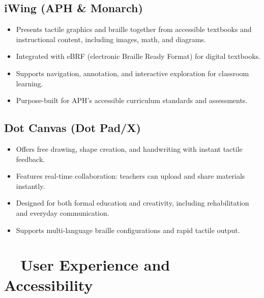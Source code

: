 \subsection{iWing (APH \& Monarch)}
\begin{itemize}
	\item Presents tactile graphics and braille together from accessible textbooks and instructional content, including images, math, and diagrams\supercite{paths_monarch}.
	\item Integrated with eBRF (electronic Braille Ready Format) for digital textbooks\supercite{nelowvision_monarch}.
	\item Supports navigation, annotation, and interactive exploration for classroom learning.
	\item Purpose-built for APH's accessible curriculum standards and assessments\supercite{ed_gov_aph}.
\end{itemize}

\subsection{Dot Canvas (Dot Pad/X)}
\begin{itemize}
	\item Offers free drawing, shape creation, and handwriting with instant tactile feedback\supercite{dot_appstore}.
	\item Features real-time collaboration: teachers can upload and share materials instantly.
	\item Designed for both formal education and creativity, including rehabilitation and everyday communication\supercite{ces_dotcanvas}.
	\item Supports multi-language braille configurations and rapid tactile output\supercite{visionaid_dotpad}.
\end{itemize}

\section{~~User Experience and Accessibility}

